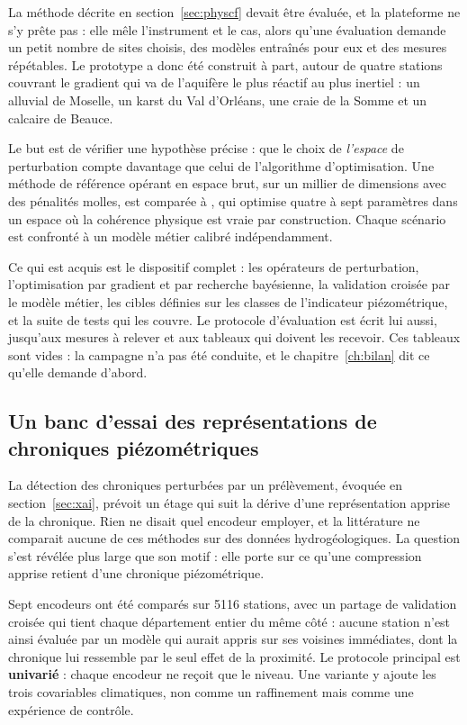 La méthode décrite en section~\ref{sec:physcf} devait être évaluée, et la plateforme ne s'y
prête pas : elle mêle l'instrument et le cas, alors qu'une évaluation demande un petit nombre de
sites choisis, des modèles entraînés pour eux et des mesures répétables. Le prototype
\physcf{} a donc été construit à part, autour de quatre stations couvrant le gradient qui va de
l'aquifère le plus réactif au plus inertiel : un alluvial de Moselle, un karst du Val d'Orléans,
une craie de la Somme et un calcaire de Beauce.

Le but est de vérifier une hypothèse précise : que le choix de \emph{l'espace} de perturbation
compte davantage que celui de l'algorithme d'optimisation. Une méthode de référence opérant en
espace brut, sur un millier de dimensions avec des pénalités molles, est comparée à \physcf{}, qui
optimise quatre à sept paramètres dans un espace où la cohérence physique est vraie par
construction. Chaque scénario est confronté à un modèle métier calibré indépendamment.

Ce qui est acquis est le dispositif complet : les opérateurs de perturbation, l'optimisation par
gradient et par recherche bayésienne, la validation croisée par le modèle métier, les cibles
définies sur les classes de l'indicateur piézométrique, et la suite de tests qui les couvre. Le
protocole d'évaluation est écrit lui aussi, jusqu'aux mesures à relever et aux tableaux qui
doivent les recevoir. Ces tableaux sont vides : la campagne n'a pas été conduite, et le
chapitre~\ref{ch:bilan} dit ce qu'elle demande d'abord.

\subsection{Un banc d'essai des représentations de chroniques piézométriques}

La détection des chroniques perturbées par un prélèvement, évoquée en section~\ref{sec:xai},
prévoit un étage qui suit la dérive d'une représentation apprise de la chronique. Rien ne disait
quel encodeur employer, et la littérature ne comparait aucune de ces méthodes sur des données
hydrogéologiques. La question s'est révélée plus large que son motif : elle porte sur ce qu'une
compression apprise retient d'une chronique piézométrique.

Sept encodeurs ont été comparés sur \num{5116} stations, avec un partage de validation croisée
qui tient chaque département entier du même côté : aucune station n'est ainsi évaluée par un
modèle qui aurait appris sur ses voisines immédiates, dont la chronique lui ressemble par le
seul effet de la proximité. Le protocole principal est \textbf{univarié} : chaque encodeur ne reçoit que le
niveau. Une variante y ajoute les trois covariables climatiques, non comme un raffinement mais
comme une expérience de contrôle.

